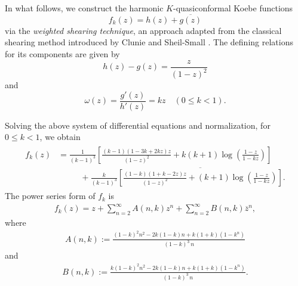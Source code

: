 \documentclass[11pt, reqno]{amsart}
\newtheorem{example}{Example}
\numberwithin{equation}{section}
\begin{document}
In what follows, we construct the harmonic $K$-quasiconformal Koebe functions
$$f_k(z)=h(z)+\overline{g(z)}$$
via the \textit{weighted shearing technique}, an approach adapted from the classical shearing method introduced by Clunie and Sheil-Small \cite{cs}.
The defining relations for its components are given by
$$h(z)-g(z)=\frac{z}{(1-z)^2}$$
and
$$\omega(z)=\frac{g'(z)}{h'(z)}=k z\quad (0\leq k<1).$$




Solving the above system of differential equations and normalization, for $0\leq k<1$, we obtain \begin{align}\begin{split}\label{31}
  f_k(z)&=\frac{1}{(k-1)^3}{\left[\frac{(k-1)(1-3k+2kz)z }{(1-z)^2}+k(k+1) \log\left(\frac{1-z}{1-k z}\right)\right]}\\ & \qquad\ \ \ +\frac{k}{(k-1)^3}\overline{{\left[\frac{(1-k)(1+k-2z)z}{(1-z)^2}+(k+1) \log\left(\frac{1-z}{1-k z}\right)\right]} }.\end{split}
\end{align}
The power series form of $f_k$ is %
\begin{equation}\label{032}
\begin{aligned}
    f_k(z)=z+\sum_{n=2}^{\infty}A(n,k)z^n+\sum_{n=2}^{\infty}B(n,k)\overline{z}^n,
\end{aligned}
\end{equation}
where \begin{equation}\begin{aligned}\label{033}
A(n,k):=\frac{(1-k)^2n^2-2k(1-k)n+k(1+k)(1-k^n)}{(1-k)^3\,n}
\end{aligned}
\end{equation} and \begin{equation}\begin{aligned}\label{034}
B(n,k):=\frac{k(1-k)^2n^2-2k(1-k)n+k(1+k)(1-k^n)}{(1-k)^3\,n}.
\end{aligned}
\end{equation}
\end{document}
